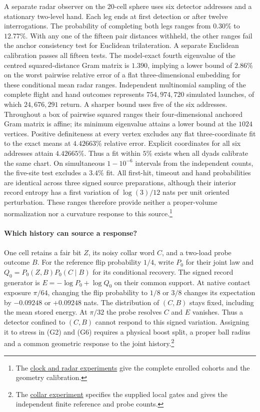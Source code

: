 \documentclass[11pt]{article}
\begin{document}
A separate radar observer on the 20-cell sphere uses six detector
addresses and a stationary two-level hand. Each leg ends at first
detection or after twelve interrogations. The probability of completing
both legs ranges from $0.30\%$ to $12.77\%$. With any one of the fifteen
pair distances withheld, the other ranges fail the anchor consistency
test for Euclidean trilateration. A separate Euclidean calibration passes
all fifteen tests. The model-exact fourth eigenvalue of the centred
squared-distance Gram matrix is $1.390$, implying a lower bound of
$2.86\%$ on the worst pairwise relative error of a flat three-dimensional
embedding for these conditional mean radar ranges. Independent multinomial
sampling of the complete flight and hand outcomes represents
$754{,}974{,}720$ simulated launches, of which $24{,}676{,}291$ return.
A sharper bound uses five of the six addresses. Throughout a box of
pairwise squared ranges their four-dimensional anchored Gram matrix
is affine; its minimum eigenvalue attains a lower bound at the $1024$
vertices. Positive definiteness at every vertex excludes any flat
three-coordinate fit to the exact means at $4.42663\%$ relative error.
Explicit coordinates for all six addresses attain $4.42665\%$.
Thus a fit within $5\%$ exists when all dyads calibrate the same chart.
On simultaneous $1-10^{-6}$ intervals from the independent counts,
the five-site test excludes a $3.4\%$ fit. All first-hit, timeout and hand
probabilities are identical across three signed source preparations,
although their interior record entropy has a first variation of
$\log(3)/12$ nats per unit oriented perturbation. These ranges therefore
provide neither a proper-volume normalization nor a curvature response
to this source.\footnote{The
\href{https://github.com/FloatingPragma/observer-patch-holography/tree/main/model/experiments/interval_echo_einstein_station}{clock and radar experiments}
give the complete enrolled cohorts and the geometry calibration.}

\paragraph{Which history can source a response?}
One cell retains a fair bit $Z$, its noisy collar word $C$, and a
two-load probe outcome $B$. For the reference flip probability $1/4$,
write $P_0$ for their joint law and $Q_0=P_0(Z,B)P_0(C\mid B)$ for
its conditional recovery. The signed record generator is
$E=-\log P_0+\log Q_0$ on their common support. At native contact
exposure $\pi/64$, changing the flip probability to $1/8$ or $3/8$
changes its expectation by $-0.09248$ or $+0.09248$ nats. The
distribution of $(C,B)$ stays fixed, including the mean stored energy.
At $\pi/32$ the probe resolves $C$ and $E$ vanishes. Thus a detector
confined to $(C,B)$ cannot respond to this signed variation. Assigning
it to stress in (G2) and (G6) requires a physical boost split, a
proper ball radius and a common geometric response to the joint history.\footnote{The
\href{https://github.com/FloatingPragma/observer-patch-holography/tree/main/model/experiments/material_inertia}{collar experiment}
specifies the supplied local gates and gives the independent finite reference and probe counts.}
\end{document}
